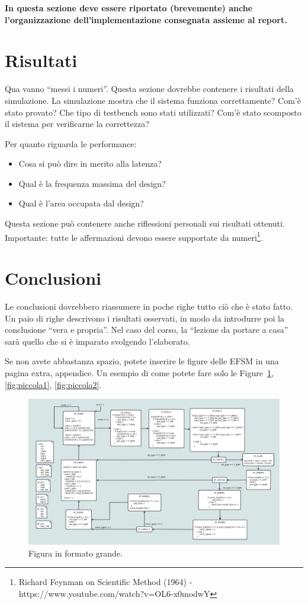 \documentclass[]{IEEEtran}
\begin{document}
\textbf{In questa sezione deve essere riportato (brevemente) anche l'organizzazione dell'implementazione consegnata assieme al report.}

\section{Risultati}

Qua vanno ``messi i numeri''. Questa sezione dovrebbe contenere i risultati della simulazione. La simulazione mostra che il sistema funziona correttamente? Com'è stato provato? Che tipo di testbench sono stati utilizzati? Com'è stato scomposto il sistema per verificarne la correttezza?

Per quanto riguarda le performance:
\begin{itemize}
\item Cosa si può dire in merito alla latenza?
\item Qual è la frequenza massima del design? 
\item Qual è l'area occupata dal design? 
\end{itemize}

Questa sezione può contenere anche riflessioni personali sui risultati ottenuti. Importante: tutte le affermazioni devono essere supportate da numeri\footnote{Richard Feynman on Scientific Method (1964) -\\ https://www.youtube.com/watch?v=OL6-x0modwY}.

\section{Conclusioni}
Le conclusioni dovrebbero riassumere in poche righe  tutto ciò che è stato fatto. Un paio di righe descrivono i risultati osservati, in modo da introdurre poi la conclusione ``vera e propria''. Nel caso del corso, la ``lezione da portare a casa'' sarà quello che si è imparato svolgendo l'elaborato.





\appendix
Se non avete abbastanza spazio, potete inserire le figure delle EFSM in una  pagina extra, appendice. Un esempio di come potete fare solo le Figure~\ref{fig:grande}, \ref{fig:piccola1}, \ref{fig:piccola2}.


\begin{figure}[bt]
\centering
\includegraphics[width=\textwidth]{figures/EFSM-multiplier}
\caption{Figura in formato grande.}
\label{fig:grande}
\end{figure}
\end{document}
